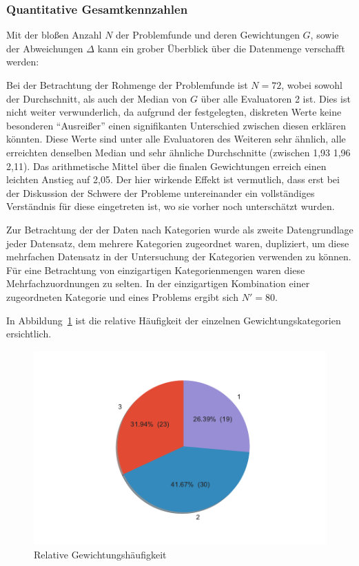 \documentclass[
  12pt,
  ngerman,
  a4paper,
]{article}
\begin{document}
\hypertarget{quantitative-gesamtkennzahlen}{%
\subsubsection{Quantitative
Gesamtkennzahlen}\label{quantitative-gesamtkennzahlen}}

Mit der bloßen Anzahl \(N\) der Problemfunde und deren Gewichtungen
\(G\), sowie der Abweichungen \(\Delta\) kann ein grober Überblick über
die Datenmenge verschafft werden:

Bei der Betrachtung der Rohmenge der Problemfunde ist \(N=72\), wobei
sowohl der Durchschnitt, als auch der Median von \(G\) über alle
Evaluatoren 2 ist. Dies ist nicht weiter verwunderlich, da aufgrund der
festgelegten, diskreten Werte keine besonderen ``Ausreißer'' einen
signifikanten Unterschied zwischen diesen erklären könnten. Diese Werte
sind unter alle Evaluatoren des Weiteren sehr ähnlich, alle erreichten
denselben Median und sehr ähnliche Durchschnitte (zwischen 1,93
\textbar{} 1,96 \textbar{} 2,11). Das arithmetische Mittel über die
finalen Gewichtungen erreich einen leichten Anstieg auf 2,05. Der hier
wirkende Effekt ist vermutlich, dass erst bei der Diskussion der Schwere
der Probleme untereinander ein vollständiges Verständnis für diese
eingetreten ist, wo sie vorher noch unterschätzt wurden.

Zur Betrachtung der der Daten nach Kategorien wurde als zweite
Datengrundlage jeder Datensatz, dem mehrere Kategorien zugeordnet waren,
dupliziert, um diese mehrfachen Datensatz in der Untersuchung der
Kategorien verwenden zu können. Für eine Betrachtung von einzigartigen
Kategorienmengen waren diese Mehrfachzuordnungen zu selten. In der
einzigartigen Kombination einer zugeordneten Kategorie und eines
Problems ergibt sich \(N'=80\).

In Abbildung~\ref{fig:rel-weights} ist die relative Häufigkeit der
einzelnen Gewichtungskategorien ersichtlich.

\begin{figure}
\hypertarget{fig:rel-weights}{%
\centering
\includegraphics{./tex2pdf.-c803d322dfea80aa/388ffccc4f22fb151ed851faca741ed1f470f666.pdf}
\caption{Relative Gewichtungshäufigkeit}\label{fig:rel-weights}
}
\end{figure}
\end{document}
